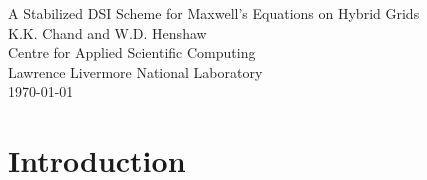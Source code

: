\documentclass[12pt]{article}
\begin{document}
\vspace{5\baselineskip}
\begin{flushleft}
{\LARGE A Stabilized DSI Scheme for Maxwell's Equations on Hybrid Grids} \\
\vspace{2\baselineskip}
K.K. Chand and W.D. Henshaw\\
Centre for Applied Scientific Computing  \\
Lawrence Livermore National Laboratory      \\
\vspace{\baselineskip}
\today\\


\vspace{2\baselineskip}
\end{flushleft}

\begin{abstract}
\end{abstract}

\tableofcontents
\section{Introduction}\label{sec:intro}
\end{document}
